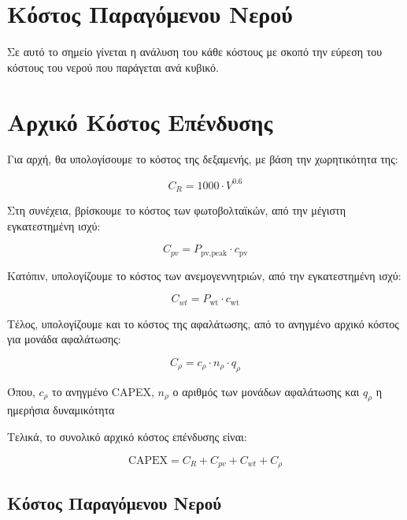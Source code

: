 \section{Κόστος Παραγόμενου Νερού}

Σε αυτό το σημείο γίνεται η ανάλυση του κάθε κόστους με σκοπό την εύρεση του
κόστους του νερού που παράγεται ανά κυβικό.

\section{Αρχικό Κόστος Επένδυσης}

Για αρχή, θα υπολογίσουμε το κόστος της δεξαμενής, με βάση την χωρητικότητα της:

\begin{equation}\label{eq:tank_cost}
	C_R = 1000 \cdot V^{0.6}
\end{equation}

Στη συνέχεια, βρίσκουμε το κόστος των φωτοβολταϊκών, από την μέγιστη εγκατεστημένη ισχύ:

\begin{equation}\label{eq:pv_cost}
	C_{pv}= P_{\text{pv,peak}}\cdot c_{\text{pv}}
\end{equation}

Κατόπιν, υπολογίζουμε το κόστος των ανεμογεννητριών, από την εγκατεστημένη ισχύ:

\begin{equation}\label{eq:wt_cost}
	C_{wt}= P_{\text{wt}}\cdot c_{\text{wt}}
\end{equation}

Τέλος, υπολογίζουμε και το κόστος της αφαλάτωσης, από το ανηγμένο αρχικό κόστος
για μονάδα αφαλάτωσης:

\begin{equation}\label{eq:desalination_cost}
	C_{\rho}= c_{\rho} \cdot n_{\rho} \cdot q_{\rho}
\end{equation}

Όπου, \(c_{\rho}\) το ανηγμένο CAPEX, \(n_{\rho}\) ο αριθμός των μονάδων
αφαλάτωσης και \(q_{\rho}\) η ημερήσια δυναμικότητα

Τελικά, το συνολικό αρχικό κόστος επένδυσης είναι:

\begin{equation}\label{eq:total_CAPEX}
	\text{CAPEX} = C_R + C_{pv} + C_{wt} + C_{\rho}
\end{equation}

\subsection{Κόστος Παραγόμενου Νερού}

